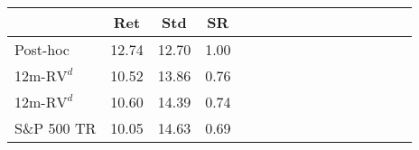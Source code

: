\begin{tabular}{lccccccccccccccc} 
\toprule 
 & Ret & Std & SR \\
 \midrule 
 Post-hoc & 12.74 & 12.70 & 1.00\\ 
 \midrule 
 12m-$\text{RV}^d$ & 10.52 & 13.86 & 0.76\\  

 \midrule 
 12m-$\text{RV}^d$ & 10.60 & 14.39 & 0.74\\  

 \midrule 
 S\&P 500 TR  & 10.05 & 14.63 & 0.69\\\bottomrule 
\end{tabular}